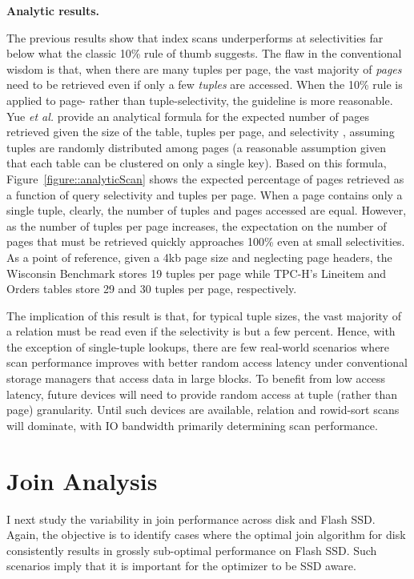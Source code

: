 \textbf{Analytic results.}

The previous results show that index scans underperforms at selectivities far below what the classic 10\% rule of thumb suggests. 
The flaw in the conventional wisdom is that, when there are many tuples per page, the vast majority of \emph{pages} need to be retrieved even if only a few \emph{tuples} are accessed.
When the 10\% rule is applied to page- rather than tuple-selectivity, the guideline is more reasonable.
Yue \emph{et al.} provide an analytical formula for the expected number of pages retrieved given the size of the table, tuples per page, and selectivity \cite{Yue1975}, assuming tuples are randomly distributed among pages (a reasonable assumption given that each table can be clustered on only a single key).
Based on this formula, Figure~\ref{figure::analyticScan} shows the expected percentage of pages retrieved as a function of query selectivity and tuples per page.
When a page contains only a single tuple, clearly, the number of tuples and pages accessed are equal.
However, as the number of tuples per page increases, the expectation on the number of pages that must be retrieved quickly approaches 100\% even at small selectivities.
As a point of reference, given a 4kb page size and neglecting page headers, the Wisconsin Benchmark stores 19 tuples per page while TPC-H's Lineitem and Orders tables store 29 and 30 tuples per page, respectively.

The implication of this result is that, for typical tuple sizes, the vast majority of a relation must be read even if the selectivity is but a few percent.
Hence, with the exception of single-tuple lookups, there are few real-world scenarios where scan performance improves with better random access latency under conventional storage managers that access data in large blocks.
To benefit from low access latency, future devices will need to provide random access at tuple (rather than page) granularity.
Until such devices are available, relation and rowid-sort scans will dominate, with IO bandwidth primarily determining scan performance.

\section{Join Analysis}
\label{sec:FlashOpti:Joins}

I next study the variability in join performance across disk and Flash SSD.  
Again, the objective is to identify cases where the optimal join algorithm for disk consistently results in grossly sub-optimal performance on Flash SSD.
Such scenarios imply that it is important for the optimizer to be SSD aware.

